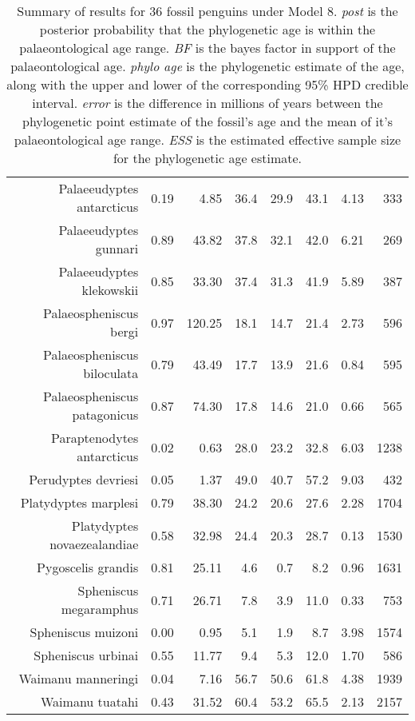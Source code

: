 \begin{table}[ht]
\begin{tabular}{rrrrrrrr}
  Palaeeudyptes antarcticus & 0.19 & 4.85 & 36.4 & 29.9 & 43.1 & 4.13 & 333 \\ 
  Palaeeudyptes gunnari & 0.89 & 43.82 & 37.8 & 32.1 & 42.0 & 6.21 & 269 \\ 
  Palaeeudyptes klekowskii & 0.85 & 33.30 & 37.4 & 31.3 & 41.9 & 5.89 & 387 \\ 
  Palaeospheniscus bergi & 0.97 & 120.25 & 18.1 & 14.7 & 21.4 & 2.73 & 596 \\ 
  Palaeospheniscus biloculata & 0.79 & 43.49 & 17.7 & 13.9 & 21.6 & 0.84 & 595 \\ 
  Palaeospheniscus patagonicus & 0.87 & 74.30 & 17.8 & 14.6 & 21.0 & 0.66 & 565 \\ 
  Paraptenodytes antarcticus & 0.02 & 0.63 & 28.0 & 23.2 & 32.8 & 6.03 & 1238 \\ 
  Perudyptes devriesi & 0.05 & 1.37 & 49.0 & 40.7 & 57.2 & 9.03 & 432 \\ 
  Platydyptes marplesi & 0.79 & 38.30 & 24.2 & 20.6 & 27.6 & 2.28 & 1704 \\ 
  Platydyptes novaezealandiae & 0.58 & 32.98 & 24.4 & 20.3 & 28.7 & 0.13 & 1530 \\ 
  Pygoscelis grandis & 0.81 & 25.11 & 4.6 & 0.7 & 8.2 & 0.96 & 1631 \\ 
  Spheniscus megaramphus & 0.71 & 26.71 & 7.8 & 3.9 & 11.0 & 0.33 & 753 \\ 
  Spheniscus muizoni & 0.00 & 0.95 & 5.1 & 1.9 & 8.7 & 3.98 & 1574 \\ 
  Spheniscus urbinai & 0.55 & 11.77 & 9.4 & 5.3 & 12.0 & 1.70 & 586 \\ 
  Waimanu manneringi & 0.04 & 7.16 & 56.7 & 50.6 & 61.8 & 4.38 & 1939 \\ 
  Waimanu tuatahi & 0.43 & 31.52 & 60.4 & 53.2 & 65.5 & 2.13 & 2157 \\ 
   \hline
\end{tabular}
\caption{Summary of results for 36 fossil penguins under Model 8. {\em post} is the posterior probability that the phylogenetic age is within the palaeontological age range. {\em BF} is the bayes factor in support of the palaeontological age. {\em phylo age} is the phylogenetic estimate of the age, along with the upper and lower of the corresponding 95\% HPD credible interval. {\em error} is the difference in millions of years between the phylogenetic point estimate of the fossil's age and the mean of it's palaeontological age range. {\em ESS} is the estimated effective sample size for the phylogenetic age estimate.} 
\label{fossilTable8}
\end{table}
